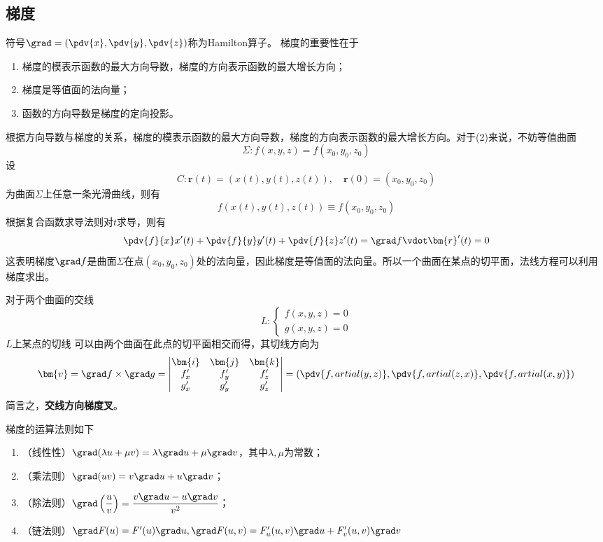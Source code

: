 \subsection{梯度}
符号$\grad=\left(\pdv{x},\pdv{y},\pdv{z}\right)$称为Hamilton算子。
梯度的重要性在于
\begin{enumerate}[(1)]
    \item 梯度的模表示函数的最大方向导数，梯度的方向表示函数的最大增长方向；
    \item 梯度是等值面的法向量；
    \item 函数的方向导数是梯度的定向投影。
\end{enumerate}

根据方向导数与梯度的关系，梯度的模表示函数的最大方向导数，梯度的方向表示函数的最大增长方向。对于(2)来说，不妨等值曲面
\[ \Sigma : f(x,y,z) = f(x_0,y_0,z_0) \]
设
\[ C: \bm{r}(t) = (x(t),y(t),z(t)),\quad \bm{r}(0) = (x_0,y_0,z_0) \]
为曲面$\Sigma$上任意一条光滑曲线，则有
\[ f(x(t),y(t),z(t)) \equiv f(x_0,y_0,z_0) \]
根据复合函数求导法则对$t$求导，则有
\[
    \pdv{f}{x} x'(t) + \pdv{f}{y} y'(t) + \pdv{f}{z} z'(t)
    = \grad f\vdot\bm{r}'(t)
    = 0
\]
这表明梯度$\grad f$是曲面$\Sigma$在点$(x_0,y_0,z_0)$处的法向量，因此梯度是等值面的法向量。所以一个曲面在某点的切平面，法线方程可以利用梯度求出。

对于两个曲面的交线
\[
    L :
    \begin{cases}
        f(x,y,z) = 0 \\
        g(x,y,z) = 0
    \end{cases}
\]
$L$上某点的切线
可以由两个曲面在此点的切平面相交而得，其切线方向为
\[
    \bm{v} = \grad f \times \grad g
    =
    \begin{vmatrix}
        \bm{i} & \bm{j} & \bm{k} \\
        f'_x   & f'_y   & f'_z   \\
        g'_x   & g'_y   & g'_z
    \end{vmatrix}
    = \left(\pdv{f,artial(y,z)}, \pdv{f,artial(z,x)},\pdv{f,artial(x,y)}\right)
\]
简言之，\textbf{\textsf{交线方向梯度叉}}。

梯度的运算法则如下
\begin{enumerate}[(1)]
    \item （线性性）$\grad (\lambda u + \mu v) = \lambda \grad u + \mu \grad v$，其中$\lambda,\mu$为常数；
    \item （乘法则）$\grad(uv) = v\grad u + u\grad v$；
    \item （除法则）$\grad\left(\dfrac{u}{v}\right) = \dfrac{v\grad u - u\grad v}{v^2}$；
    \item （链法则）$\grad F(u) = F'(u)\grad u, \grad F(u,v) = F'_u(u,v)\grad u + F'_v(u,v)\grad v$
\end{enumerate}


